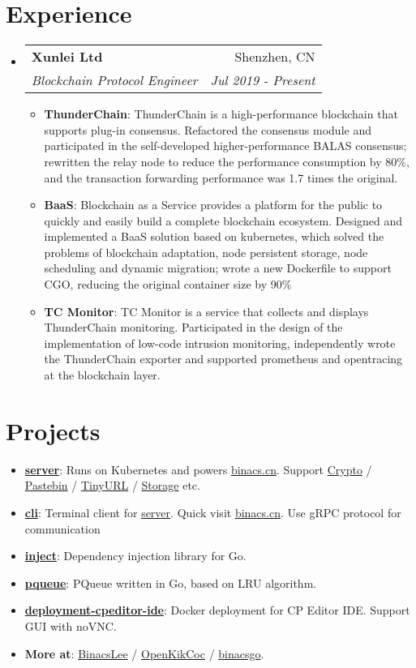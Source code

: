 \documentclass[letterpaper,12pt]{article}
\makeatletter
\newcommand{\resumeItem}[2]{
  \item\small{
    \textbf{#1}{: #2 \vspace{-2pt}}
  }
}
\newcommand{\resumeSubheading}[4]{
  \vspace{-1pt}\item
    \begin{tabular*}{0.97\textwidth}[t]{l@{\extracolsep{\fill}}r}
      \textbf{#1} & #2 \\
      \textit{\small#3} & \textit{\small #4} \\
    \end{tabular*}\vspace{-5pt}
}
\newcommand{\resumeSubItem}[2]{\resumeItem{#1}{#2}\vspace{-4pt}}
\newcommand{\resumeSubHeadingListStart}{\begin{itemize}[leftmargin=*]}
\newcommand{\resumeSubHeadingListEnd}{\end{itemize}}
\newcommand{\resumeItemListStart}{\begin{itemize}}
\newcommand{\resumeItemListEnd}{\end{itemize}\vspace{-5pt}}
\makeatother
\begin{document}
\section{Experience}
  \resumeSubHeadingListStart
    \resumeSubheading
      {Xunlei Ltd}{Shenzhen, CN}
      {Blockchain Protocol Engineer}{Jul 2019 - Present}
      \resumeItemListStart
        \resumeItem{ThunderChain}
          {ThunderChain is a high-performance blockchain that supports plug-in consensus.
          Refactored the consensus module and participated in the self-developed higher-performance
          BALAS consensus; rewritten the relay node to reduce the performance consumption by 80\%,
          and the transaction forwarding performance was 1.7 times the original.}
        \resumeItem{BaaS}
          {Blockchain as a Service provides a platform for the public to quickly and easily build a
          complete blockchain ecosystem.
          Designed and implemented a BaaS solution based on kubernetes, which solved the problems of
          blockchain adaptation, node persistent storage, node scheduling and dynamic migration; wrote
          a new Dockerfile to support CGO, reducing the original container size by 90\%}
        \resumeItem{TC Monitor}
          {TC Monitor is a service that collects and displays ThunderChain monitoring. Participated in
          the design of the implementation of low-code intrusion monitoring, independently wrote the
          ThunderChain exporter and supported prometheus and opentracing at the blockchain layer.}
      \resumeItemListEnd
  \resumeSubHeadingListEnd

\section{Projects}
  \resumeSubHeadingListStart
    \resumeSubItem{\href{https://github.com/BinacsLee/server}{server}}
      {Runs on Kubernetes and powers \href{https://binacs.cn/}{binacs.cn}.
      Support   \href{https://binacs.cn/toys/crypto}{Crypto} / 
                \href{https://binacs.cn/toys/pastebin}{Pastebin} / 
                \href{https://binacs.cn/toys/tinyurl}{TinyURL} / 
                \href{https://binacs.cn/toys/storage}{Storage}
      etc.}
    \resumeSubItem{\href{https://github.com/BinacsLee/cli}{cli}}
      {Terminal client for \href{https://github.com/BinacsLee/server}{server}. Quick visit
      \href{https://binacs.cn/}{binacs.cn}. Use gRPC protocol for communication}
    \resumeSubItem{\href{https://github.com/binacsgo/inject}{inject}}
      {Dependency injection library for Go.}
    \resumeSubItem{\href{https://github.com/binacsgo/pqueue}{pqueue}}
      {PQueue written in Go, based on LRU algorithm.}
    \resumeSubItem{\href{https://github.com/OpenKikCoc/deployment-cpeditor-ide}{deployment-cpeditor-ide}}
      {Docker deployment for CP Editor IDE. Support GUI with noVNC.}
    \resumeSubItem{More at}
      {\href{https://github.com/BinacsLee}{BinacsLee} /
       \href{https://github.com/OpenKikCoc}{OpenKikCoc} /
       \href{https://github.com/binacsgo}{binacsgo}.}
  \resumeSubHeadingListEnd

\end{document}
